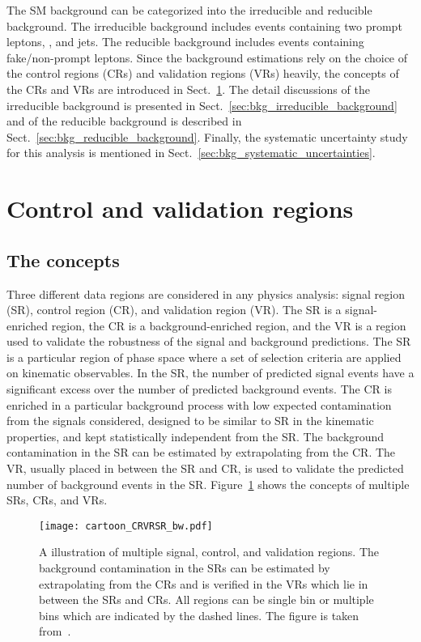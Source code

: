 The SM background can be categorized into the irreducible and reducible background.
The irreducible background includes events containing two prompt leptons, \met, and jets.
The reducible background includes events containing fake/non-prompt leptons.
Since the background estimations rely on the choice of the control regions (CRs) and validation regions (VRs) heavily, the concepts of the CRs and VRs are introduced in Sect.~\ref{sec:bkg_control_and_validation_regions}.
The detail discussions of the irreducible background is presented in Sect.~\ref{sec:bkg_irreducible_background} and of the reducible background is described in Sect.~\ref{sec:bkg_reducible_background}.
Finally, the systematic uncertainty study for this analysis is mentioned in Sect.~\ref{sec:bkg_systematic_uncertainties}.


\section{Control and validation regions}
\label{sec:bkg_control_and_validation_regions}


\subsection{The concepts}
\label{subsec:bkg_SRs_CRs_VRs_concepts}
Three different data regions are considered in any physics analysis: signal region (SR), control region (CR), and validation region (VR).
The SR is a signal-enriched region, the CR is a background-enriched region, and the VR is a region used to validate the robustness of the signal and background predictions.
The SR is a particular region of phase space where a set of selection criteria are applied on kinematic observables.
In the SR, the number of predicted signal events have a significant excess over the number of predicted background events.
The CR is enriched in a particular background process with low expected contamination from the signals considered, designed to be similar to SR in the kinematic properties, and kept statistically independent from the SR.
The background contamination in the SR can be estimated by extrapolating from the CR.
The VR, usually placed in between the SR and CR, is used to validate the predicted number of background events in the SR.
Figure~\ref{fig:bkg_SRs_CRs_VRs} shows the concepts of multiple SRs, CRs, and VRs.

\begin{figure}[htbp]
    \begin{center}
        \texttt{[image: cartoon\_CRVRSR\_bw.pdf]}
        \caption{A illustration of multiple signal, control, and validation regions.
        The background contamination in the SRs can be estimated by extrapolating from the CRs and is verified in the VRs which lie in between the SRs and CRs.
        All regions can be single bin or multiple bins which are indicated by the dashed lines.
        The figure is taken from~\cite{Baak:2014wma}.}
        \label{fig:bkg_SRs_CRs_VRs}
    \end{center}
\end{figure}

